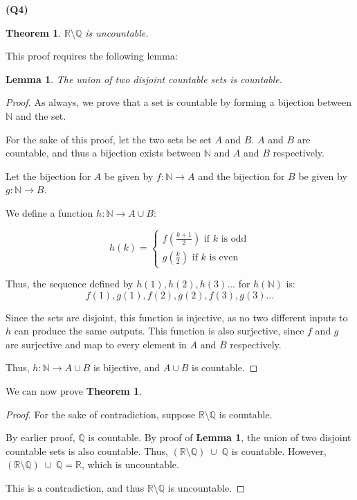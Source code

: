 \documentclass[12pt, a4paper]{article}
\newcommand{\R}{\mathbb{R}}
\newcommand{\Q}{\mathbb{Q}}
\newcommand{\N}{\mathbb{N}}
\newtheorem{theorem}{Theorem}
\newtheorem{lemma}{Lemma}
\begin{document}
\noindent\textbf{(Q4)}

\begin{theorem}
    $\R \setminus \Q$ is uncountable.
\end{theorem}

This proof requires the following lemma:
\begin{lemma}
    The union of two disjoint countable sets is countable.
\end{lemma}

\begin{proof}
    As always, we prove that a set is countable by forming a bijection between
    $\N$ and the set.

    For the sake of this proof, let the two sets be set $A$ and $B$. $A$ and $B$
    are countable, and thus a bijection exists between $\N$ and $A$ and $B$ respectively.

    Let the bijection for $A$ be given by $f\colon \N \to A$ and the bijection for $B$
    be given by $g \colon \N \to B$.

    We define a function $h \colon \N \to A \cup B$:

    \[
        h(k) = \begin{cases}
            f(\frac{k + 1}{2}) \text{ if $k$ is odd}\\
            g(\frac{k}{2}) \text{ if $k$ is even}
        \end{cases}
    \]

    Thus, the sequence defined by $h(1), h(2), h(3) \ldots$ for $h(\N)$ is:
    \[
        f(1), g(1), f(2), g(2), f(3), g(3) \ldots
    \]

    Since the sets are disjoint, this function is injective, as no two different inputs to $h$ 
    can produce the same outputs. This function is also surjective, since $f$ and $g$ are 
    surjective and map to every element in $A$ and $B$ respectively.

    Thus, $h \colon \N \to A \cup B$ is bijective, and $A \cup B$ is countable.
\end{proof}

We can now prove \textbf{Theorem 1}.

\begin{proof}
    For the sake of contradiction, suppose $\R \setminus \Q$ is countable.

    By earlier proof, $\Q$ is countable. By proof of \textbf{Lemma 1}, the union of
    two disjoint countable sets is also countable. Thus, $(\R \setminus \Q) \;\cup\; \Q$ is countable. 
    However, $(\R \setminus \Q) \;\cup\; \Q = \R$, which is uncountable.

    This is a contradiction, and thus $\R \setminus \Q$ is uncountable.
\end{proof}
\end{document}
